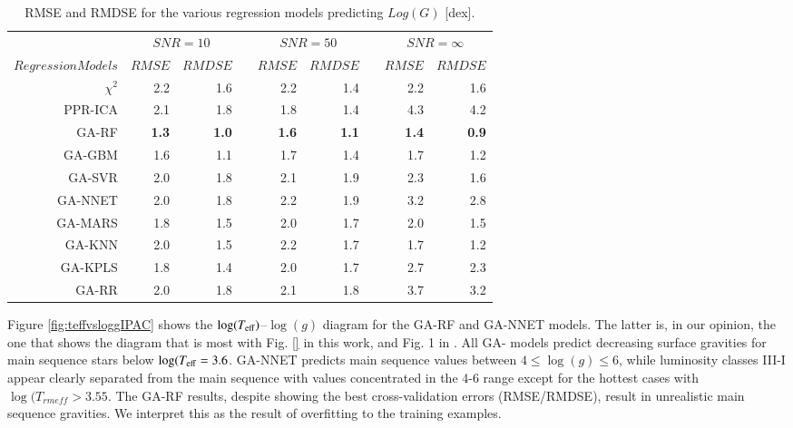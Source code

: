 
\begin{table}\centering
\begin{tabular}{@{}rrrcrrcrr@{}}\toprule
& \multicolumn{2}{c}{$SNR = 10$} & \phantom{ab}& \multicolumn{2}{c}{$SNR = 50$} &
\phantom{ab} & \multicolumn{2}{c}{$SNR = \infty$}\\
\cmidrule{2-3} \cmidrule{5-6} \cmidrule{8-9}
$Regression Models$ & $RMSE$ & $RMDSE$ && $RMSE$ & $RMDSE$     && $RMSE$       & $RMDSE$ \\ \midrule
$\chi^2$    & 2.2       & 1.6       && 2.2       & 1.4       && 2.2       & 1.6 \\
PPR-ICA     & 2.1       & 1.8       && 1.8       & 1.4       && 4.3       & 4.2 \\
GA-RF       & {\bf 1.3} & {\bf 1.0} && {\bf 1.6} & {\bf 1.1} && {\bf 1.4} & {\bf 0.9} \\
GA-GBM      & 1.6       & 1.1       && 1.7       & 1.4       && 1.7       & 1.2 \\
GA-SVR      & 2.0       & 1.8       && 2.1       & 1.9       && 2.3       & 1.6 \\
GA-NNET     & 2.0       & 1.8       && 2.2       & 1.9       && 3.2       & 2.8 \\
GA-MARS     & 1.8       & 1.5       && 2.0       & 1.7       && 2.0       & 1.5 \\
GA-KNN      & 2.0       & 1.5       && 2.2       & 1.7       && 1.7       & 1.2 \\
GA-KPLS     & 1.8       & 1.4       && 2.0       & 1.7       && 2.7       & 2.3 \\
GA-RR       & 2.0       & 1.8       && 2.1       & 1.8       && 3.7       & 3.2 \\

\bottomrule
\end{tabular}
\caption {RMSE and RMDSE for the various regression models predicting $Log(G)$ [dex].} 
\label{tab:models_G_rmse} 
\end{table}

Figure \ref{fig:teffvsloggIPAC} shows the $\log(T_{\rm
  eff})$--$\log(g)$ diagram for the GA-RF and GA-NNET models. The
  latter is, in our opinion, the one that shows the diagram that is
  most with Fig. \ref{} in this work, and Fig. 1
  in \cite{cesetti}. All GA- models predict decreasing surface
  gravities for main sequence stars below $\log(T_{\rm
  eff}=3.6$. GA-NNET predicts main sequence values between
  $4 \le \log(g) \le6$, while luminosity classes III-I appear clearly
  separated from the main sequence with values concentrated in the 4-6
  range except for the hottest cases with $\log(T_{rm eff} >
  3.55$. The GA-RF results, despite showing the best cross-validation
  errors (RMSE/RMDSE), result in unrealistic main sequence
  gravities. We interpret this as the result of overfitting to the
  training examples.

